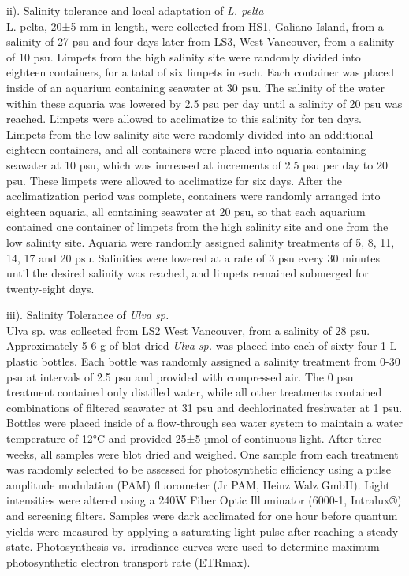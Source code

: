 \documentclass[
  11pt,
]{article}
\begin{document}
ii). Salinity tolerance and local adaptation of \emph{L. pelta}\\
L. pelta, 20±5 mm in length, were collected from HS1, Galiano Island, from a salinity of 27 psu and four days later from LS3, West Vancouver, from a salinity of 10 psu. Limpets from the high salinity site were randomly divided into eighteen containers, for a total of six limpets in each. Each container was placed inside of an aquarium containing seawater at 30 psu. The salinity of the water within these aquaria was lowered by 2.5 psu per day until a salinity of 20 psu was reached. Limpets were allowed to acclimatize to this salinity for ten days. Limpets from the low salinity site were randomly divided into an additional eighteen containers, and all containers were placed into aquaria containing seawater at 10 psu, which was increased at increments of 2.5 psu per day to 20 psu. These limpets were allowed to acclimatize for six days. After the acclimatization period was complete, containers were randomly arranged into eighteen aquaria, all containing seawater at 20 psu, so that each aquarium contained one container of limpets from the high salinity site and one from the low salinity site. Aquaria were randomly assigned salinity treatments of 5, 8, 11, 14, 17 and 20 psu. Salinities were lowered at a rate of 3 psu every 30 minutes until the desired salinity was reached, and limpets remained submerged for twenty-eight days.

iii). Salinity Tolerance of \emph{Ulva sp.}\\
Ulva sp. was collected from LS2 West Vancouver, from a salinity of 28 psu. Approximately 5-6 g of blot dried \emph{Ulva sp.} was placed into each of sixty-four 1 L plastic bottles. Each bottle was randomly assigned a salinity treatment from 0-30 psu at intervals of 2.5 psu and provided with compressed air. The 0 psu treatment contained only distilled water, while all other treatments contained combinations of filtered seawater at 31 psu and dechlorinated freshwater at 1 psu. Bottles were placed inside of a flow-through sea water system to maintain a water temperature of 12°C and provided 25±5 µmol of continuous light. After three weeks, all samples were blot dried and weighed. One sample from each treatment was randomly selected to be assessed for photosynthetic efficiency using a pulse amplitude modulation (PAM) fluorometer (Jr PAM, Heinz Walz GmbH). Light intensities were altered using a 240W Fiber Optic Illuminator (6000-1, Intralux®) and screening filters. Samples were dark acclimated for one hour before quantum yields were measured by applying a saturating light pulse after reaching a steady state. Photosynthesis vs.~irradiance curves were used to determine maximum photosynthetic electron transport rate (ETRmax).
\end{document}
